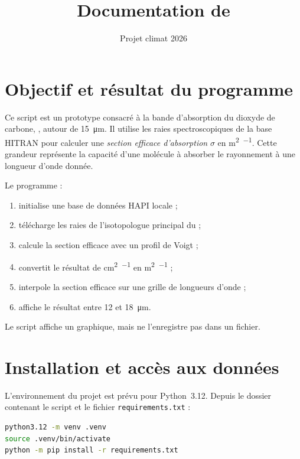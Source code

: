 \documentclass[11pt,a4paper]{article}
\title{Documentation de \code{1\_section\_efficace\_CO2\_15um.py}}
\author{Projet climat 2026}
\date{}
\newcommand{\code}[1]{\texttt{#1}}
\begin{document}
\maketitle
\tableofcontents

\section{Objectif et résultat du programme}

Ce script est un prototype consacré à la bande d'absorption du dioxyde de
carbone, , autour de \SI{15}{\micro\metre}. Il utilise les raies
spectroscopiques de la base HITRAN pour calculer une \emph{section efficace
d'absorption} $\sigma$ en \si{\metre\squared\per\molecule}. Cette grandeur
représente la capacité d'une molécule à absorber le rayonnement à une
longueur d'onde donnée.

Le programme :

\begin{enumerate}
  \item initialise une base de données HAPI locale ;
  \item télécharge les raies de l'isotopologue principal du  ;
  \item calcule la section efficace avec un profil de Voigt ;
  \item convertit le résultat de
        \si{\centi\metre\squared\per\molecule} en
        \si{\metre\squared\per\molecule} ;
  \item interpole la section efficace sur une grille de longueurs d'onde ;
  \item affiche le résultat entre 12 et \SI{18}{\micro\metre}.
\end{enumerate}

Le script affiche un graphique, mais ne l'enregistre pas dans un fichier.

\section{Installation et accès aux données}

L'environnement du projet est prévu pour Python~3.12. Depuis le dossier
contenant le script et le fichier \code{requirements.txt} :

\begin{lstlisting}[language=bash]
python3.12 -m venv .venv
source .venv/bin/activate
python -m pip install -r requirements.txt
\end{lstlisting}
\end{document}

